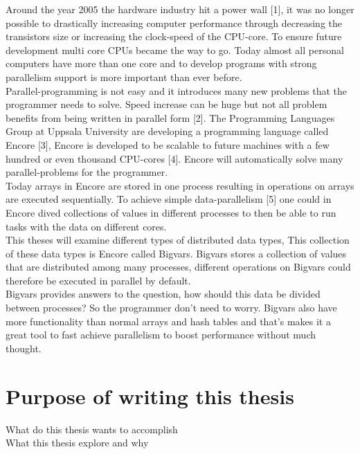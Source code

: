 Around the year 2005 the hardware industry hit a power wall [1], it was no longer possible to drastically increasing computer performance through decreasing the transistors size or increasing the clock-speed of the CPU-core. To ensure future development multi core CPUs became the way to go. Today almost all personal computers have more than one core and to develop programs with strong parallelism support is more important than ever before.\\

Parallel-programming is not easy and it introduces many new problems that the programmer needs to solve. Speed increase can be huge but not all problem benefits from being written in parallel form [2]. The Programming Languages Group at Uppsala University are developing a programming language called Encore [3], Encore is developed to be scalable to future machines with a few hundred or even thousand CPU-cores [4]. Encore will automatically solve many parallel-problems for the programmer. \\

Today arrays in Encore are stored in one process resulting in operations on arrays are executed sequentially. To achieve simple data-parallelism [5] one could in Encore dived collections of values in different processes to then be able to run tasks with the data on different cores. \\

This theses will examine different types of distributed data types, This collection of these data types is Encore called Bigvars. Bigvars stores a collection of values that are distributed among many processes, different operations on Bigvars could therefore be executed in parallel by default. \\

Bigvars provides answers to the question, how should this data be divided between processes? So the programmer don’t need to worry. Bigvars also have more functionality than normal arrays and hash tables and that's makes it a great tool to fast achieve parallelism to boost performance without much thought. \\

\section{Purpose of writing this thesis}
What do this thesis wants to accomplish\\
What this thesis explore and why